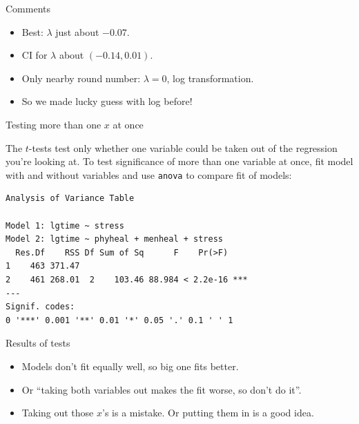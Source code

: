 \begin{frame}[fragile]{Comments}
  
\begin{itemize}
\item Best: $\lambda$ just about $-0.07$.
\item CI for $\lambda$ about $(-0.14,0.01)$.
\item Only nearby round number: $\lambda=0$, log transformation.
\item So we made lucky guess with log before!
\end{itemize}
  
  
\end{frame}


\begin{frame}[fragile]{Testing more than one $x$ at once}

The $t$-tests test only whether one variable could be taken out of the
regression you're looking at. To test significance of more than one
variable at once, fit model with and without variables and use
\texttt{anova} to compare fit of models:


{\small
\begin{knitrout}
\color{fgcolor}\begin{kframe}
\begin{alltt}
\hlkwb{=}\hlopt{~}\hlopt{+}\hlopt{+}
\hlkwb{=}\hlopt{~}
\end{alltt}
\begin{verbatim}
Analysis of Variance Table

Model 1: lgtime ~ stress
Model 2: lgtime ~ phyheal + menheal + stress
  Res.Df    RSS Df Sum of Sq      F    Pr(>F)    
1    463 371.47                                  
2    461 268.01  2    103.46 88.984 < 2.2e-16 ***
---
Signif. codes:  
0 '***' 0.001 '**' 0.01 '*' 0.05 '.' 0.1 ' ' 1
\end{verbatim}
\end{kframe}
\end{knitrout}
}


\end{frame}

\begin{frame}[fragile]{Results of tests}


\begin{itemize}

\item Models don't fit equally well, so big one fits better.
\item Or ``taking both variables out makes the fit worse, so don't do it''.
\item   Taking out those $x$'s
  is a mistake. Or putting them in is a good idea.
\end{itemize}
  
\end{frame}

